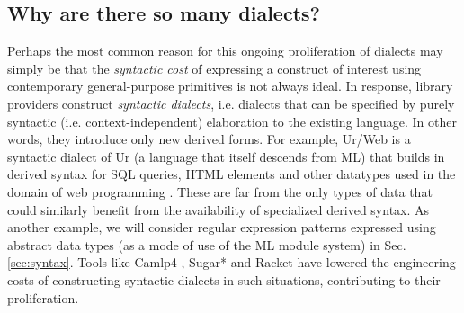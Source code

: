 \subsection{Why are there so many dialects?}
Perhaps the most common reason for this ongoing proliferation of dialects may simply be that the \emph{syntactic cost} of expressing a construct of interest using contemporary general-purpose primitives is not always ideal. In response, library providers construct \emph{syntactic dialects}, i.e. dialects that can be specified by purely syntactic (i.e. context-independent) elaboration to the existing language. In other words, they introduce only new derived forms. For example, Ur/Web is a syntactic dialect of Ur (a language that itself descends from ML) that builds in derived syntax for SQL queries, HTML elements and other datatypes used in the domain of web programming \cite{conf/popl/Chlipala15}. %
These are far from the only types of data that could similarly benefit from the availability of specialized derived syntax. As another example, we will consider regular expression patterns expressed using abstract data types (as a mode of use of the ML module system) in Sec. \ref{sec:syntax}. %
Tools like Camlp4 \cite{ocaml-manual}, Sugar* \cite{erdweg2011sugarj,erdweg2013framework} and Racket \cite{Flatt:2012:CLR:2063176.2063195} have lowered the engineering costs of constructing syntactic dialects in such situations, contributing to their proliferation. %


